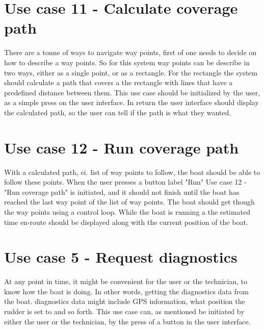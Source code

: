 \section{Use case 11 - Calculate coverage path}
There are a tonne of ways to navigate way points, first of one needs to decide on how to describe a way points. So for this system way points can be describe in two ways, either as a single point, or as a rectangle. For the rectangle the system should calculate a path that covers a the rectangle with lines that have a predefined distance between them. This use case should be initialized by the user, as a simple press on the user interface. In return the user interface should display the calculated path, so the user can tell if the path is what they wanted.

\section{Use case 12 - Run coverage path}
With a calculated path, ei. list of way points to follow, the boat should be able to follow these points. When the user presses a button label "Run" Use case 12 - "Run coverage path" is initiated, and it should not finish until the boat has reached the last way point of the list of way points. The boat should get though the way points using a control loop. While the boat is running a the estimated time en-route should be displayed along with the current position of the boat.

\section{Use case 5 - Request diagnostics}
At any point in time, it might be convenient for the user or the technician, to know how the boat is doing. In other words, getting the diagnostics data from the boat. diagnostics data might include GPS information, what position the rudder is set to and so forth. This use case can, as mentioned be initiated by either the user or the technician, by the press of a button in the user interface. 



